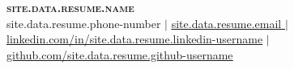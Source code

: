 \documentclass[letterpaper,11pt]{article}
\begin{document}

\begin{center}
    \textbf{\Huge \scshape {{site.data.resume.name}}} \\ \vspace{1pt}
    \small {{site.data.resume.phone-number}} $|$ \href{mailto:x@x.com}{\underline{ {{site.data.resume.email}} }} $|$ 
    \href{https://linkedin.com/in/...}{\underline{linkedin.com/in/{{site.data.resume.linkedin-username}}}} $|$
    \href{https://github.com/...}{\underline{github.com/{{site.data.resume.github-username}}}}
\end{center}


\end{document}
